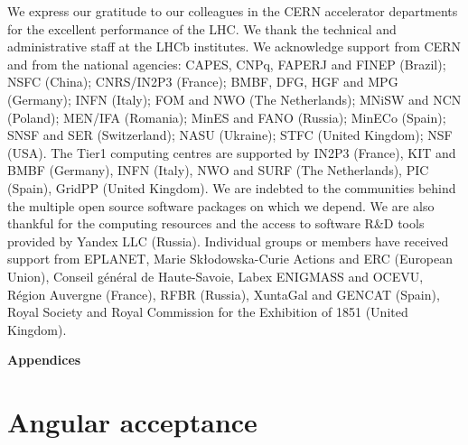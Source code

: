 \documentclass[12pt,a4paper]{article}
\begin{document}
\noindent We express our gratitude to our colleagues in the CERN
accelerator departments for the excellent performance of the LHC. We
thank the technical and administrative staff at the LHCb
institutes. We acknowledge support from CERN and from the national
agencies: CAPES, CNPq, FAPERJ and FINEP (Brazil); NSFC (China);
CNRS/IN2P3 (France); BMBF, DFG, HGF and MPG (Germany); INFN (Italy); 
FOM and NWO (The Netherlands); MNiSW and NCN (Poland); MEN/IFA (Romania); 
MinES and FANO (Russia); MinECo (Spain); SNSF and SER (Switzerland); 
NASU (Ukraine); STFC (United Kingdom); NSF (USA).
The Tier1 computing centres are supported by IN2P3 (France), KIT and BMBF 
(Germany), INFN (Italy), NWO and SURF (The Netherlands), PIC (Spain), GridPP 
(United Kingdom).
We are indebted to the communities behind the multiple open 
source software packages on which we depend. We are also thankful for the 
computing resources and the access to software R\&D tools provided by Yandex LLC (Russia).
Individual groups or members have received support from 
EPLANET, Marie Sk\l{}odowska-Curie Actions and ERC (European Union), 
Conseil g\'{e}n\'{e}ral de Haute-Savoie, Labex ENIGMASS and OCEVU, 
R\'{e}gion Auvergne (France), RFBR (Russia), XuntaGal and GENCAT (Spain), Royal Society and Royal
Commission for the Exhibition of 1851 (United Kingdom).
 
\clearpage
{\noindent\normalfont\bfseries\Large Appendices}
\appendix

\section{Angular acceptance}
\label{sec:angularAcc}
\end{document}
